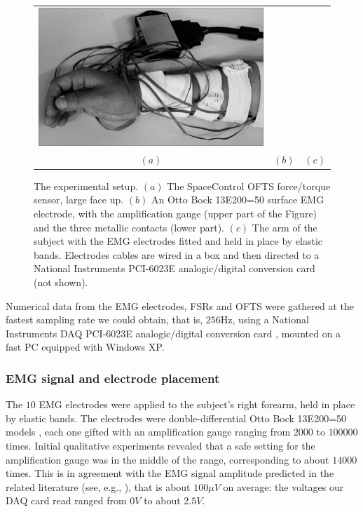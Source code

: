 \begin{figure}[!ht]
\begin{tabular}{ccc}
    \includegraphics[height=0.16\textheight]{figs/setup} \\
    $(a)$ & $(b)$ & $(c)$ \\
  \end{tabular}
  \caption{The experimental setup. $(a)$ The SpaceControl OFTS
    force/torque sensor, large face up. $(b)$ An Otto Bock 13E200=50
    surface EMG electrode, with the amplification gauge (upper part of
    the Figure) and the three metallic contacts (lower part). $(c)$
    The arm of the subject with the EMG electrodes fitted and held in
    place by elastic bands. Electrodes cables are wired in a box and
    then directed to a National Instruments PCI-6023E analogic/digital
    conversion card (not shown).}
  \label{fig:setup}
\end{figure}

Numerical data from the EMG electrodes, FSRs and OFTS were gathered at
the fastest sampling rate we could obtain, that is, $256$Hz, using a
National Instruments DAQ PCI-6023E analogic/digital conversion card
\cite{nidaq}, mounted on a fast PC equipped with Windows XP.

\subsubsection{EMG signal and electrode placement}
\label{subsubsec:electrodes}

The $10$ EMG electrodes were applied to the subject's right forearm,
held in place by elastic bands. The electrodes were
double-differential Otto Bock 13E200=50 models \cite{ottobock}, each
one gifted with an amplification gauge ranging from $2000$ to $100000$
times. Initial qualitative experiments revealed that a safe setting
for the amplification gauge was in the middle of the range,
corresponding to about $14000$ times. This is in agreement with the
EMG signal amplitude predicted in the related literature (see, e.g.,
\cite{deluca}), that is about $100 \mu V$ on average: the voltages our
DAQ card read ranged from $0V$ to about $2.5V$.

